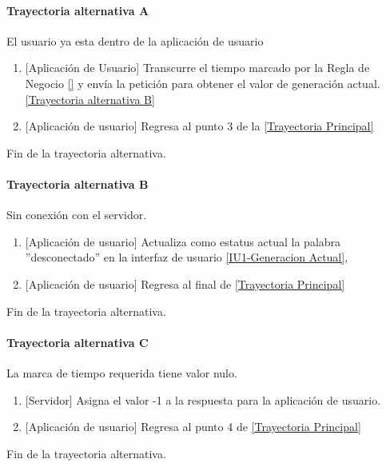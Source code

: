 \paragraph{Trayectoria alternativa A} \label{SUB-U-CU1.13:TA}
	El usuario ya esta dentro de la aplicación de usuario
	\begin{enumerate}[label=A\arabic*.]
		\item {[Aplicación de Usuario]} Transcurre el tiempo marcado por la Regla de Negocio \ref{} y envía la petición para obtener el valor de generación actual. \hyperref[SUB-U-CU1.13:TB]{[Trayectoria alternativa B]} 
		\item {[Aplicación de usuario]} Regresa al punto 3 de la \hyperref[SUB-U-CU1.13:TP]{[Trayectoria Principal]}
	\end{enumerate}
	Fin de la trayectoria alternativa.

\paragraph{Trayectoria alternativa B} \label{SUB-U-CU1.13:TB}
	Sin conexión con el servidor.
	\begin{enumerate}[label=B\arabic*.]
		\item {[Aplicación de usuario]} Actualiza como estatus actual la palabra ''desconectado'' en la interfaz de usuario \hyperref[fig:monitoreo]{[IU1-Generacion Actual]},
		\item {[Aplicación de usuario]} Regresa al final de \hyperref[SUB-U-CU1.13:TP]{[Trayectoria Principal]}
	\end{enumerate}
	Fin de la trayectoria alternativa.

\paragraph{Trayectoria alternativa C} \label{SUB-U-CU1.13:TC}
	La marca de tiempo requerida tiene valor nulo.
	\begin{enumerate}[label=C\arabic*.]
		\item {[Servidor]} Asigna el valor -1 a la respuesta para la aplicación de usuario.
		\item {[Aplicación de usuario]} Regresa al punto 4 de \hyperref[SUB-U-CU1.13:TP]{[Trayectoria Principal]}
	\end{enumerate}
	Fin de la trayectoria alternativa.

